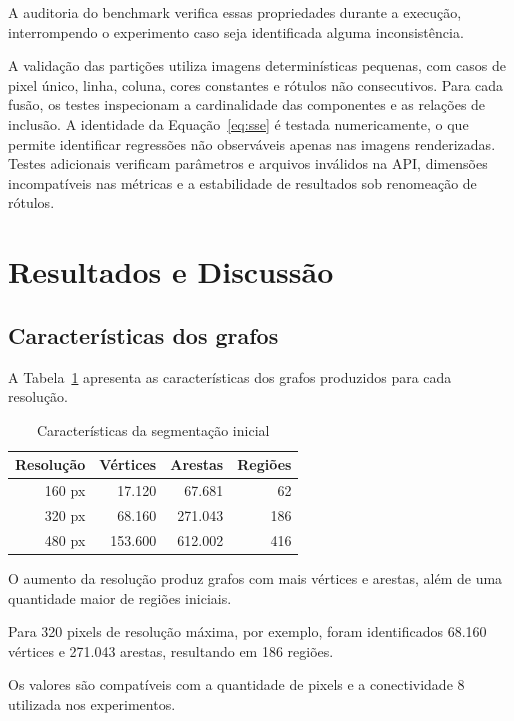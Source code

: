 \documentclass[12pt]{article}
\begin{document}
A auditoria do benchmark verifica essas
propriedades durante a execução, interrompendo
o experimento caso seja identificada
alguma inconsistência.

A validação das partições utiliza imagens determinísticas pequenas,
com casos de pixel único, linha, coluna, cores constantes e rótulos
não consecutivos. Para cada fusão, os testes inspecionam a
cardinalidade das componentes e as relações de inclusão. A
identidade da Equação~\ref{eq:sse} é testada numericamente,
o que permite identificar regressões não observáveis apenas nas
imagens renderizadas. Testes adicionais verificam parâmetros e
arquivos inválidos na API, dimensões incompatíveis nas métricas
e a estabilidade de resultados sob renomeação de rótulos.

\section{Resultados e Discussão}
\label{sec:resultados}

\subsection{Características dos grafos}

A Tabela~\ref{tab:grafos} apresenta as
características dos grafos produzidos
para cada resolução.

\begin{table}[htbp]
\centering
\caption{Características da segmentação inicial}
\label{tab:grafos}
\small
\begin{tabular}{rrrr}
\toprule
Resolução & Vértices & Arestas & Regiões \\
\midrule
160 px & 17.120 & 67.681 & 62 \\
320 px & 68.160 & 271.043 & 186 \\
480 px & 153.600 & 612.002 & 416 \\
\bottomrule
\end{tabular}
\end{table}

O aumento da resolução produz grafos com
mais vértices e arestas, além de uma
quantidade maior de regiões iniciais.

Para 320 pixels de resolução máxima,
por exemplo, foram identificados
68.160 vértices e 271.043 arestas,
resultando em 186 regiões.

Os valores são compatíveis com a
quantidade de pixels e a conectividade
8 utilizada nos experimentos.
\end{document}
